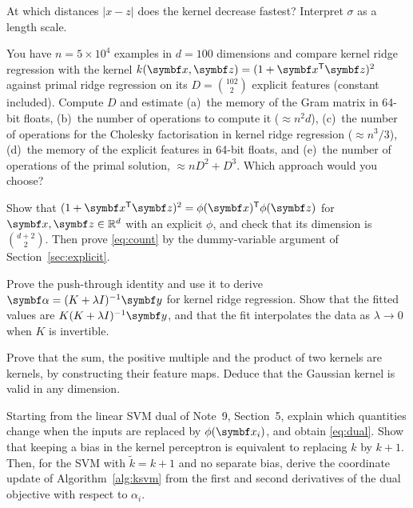 \documentclass[11pt]{article}
\newcommand{\z}{\vect{z}}
\newcommand{\y}{\vect{y}}
\newcommand{\valpha}{\vect{\alpha}}
\begin{document}
\begin{questions}
\begin{calculations}
  At which distances $|x - z|$ does the kernel decrease fastest? Interpret $\sigma$ as a length scale.
\item You have $n = 5 \times 10^4$ examples in $d = 100$ dimensions and compare kernel ridge regression with the kernel
  $k(\x, \z) = (1 + \x\T\z)^2$ against primal ridge regression on its $D = \binom{102}{2}$ explicit features (constant
  included). Compute $D$ and estimate (a)~the memory of the Gram matrix in 64-bit floats, (b)~the number of operations to
  compute it ($\approx n^2d$), (c)~the number of operations for the Cholesky factorisation in kernel ridge regression
  ($\approx n^3/3$), (d)~the memory of the explicit features in 64-bit floats, and (e)~the number of operations of the
  primal solution, $\approx nD^2 + D^3$. Which approach would you choose?
\end{calculations}

\begin{derivations}
\item Show that $(1 + \x\T\z)^2 = \phi(\x)\T\phi(\z)$ for $\x, \z \in \R^d$ with an explicit $\phi$, and check that its
  dimension is $\binom{d+2}{2}$. Then prove \eqref{eq:count} by the dummy-variable argument of Section~\ref{sec:explicit}.
\item Prove the push-through identity and use it to derive $\valpha = (K + \lambda I)^{-1}\y$ for kernel ridge regression.
  Show that the fitted values are $K(K + \lambda I)^{-1}\y$, and that the fit interpolates the data as $\lambda \to 0$ when
  $K$ is invertible.
\item Prove that the sum, the positive multiple and the product of two kernels are kernels, by constructing their feature
  maps. Deduce that the Gaussian kernel is valid in any dimension.
\item Starting from the linear SVM dual of Note~9, Section~5, explain which quantities change when the inputs are
  replaced by $\phi(\x_i)$, and obtain \eqref{eq:dual}. Show that keeping a bias in the kernel perceptron is equivalent to
  replacing $k$ by $k + 1$. Then, for the SVM with $\tilde k = k + 1$ and no separate bias, derive the coordinate update of
  Algorithm~\ref{alg:ksvm} from the first and second derivatives of the dual objective with respect to $\alpha_i$.
\end{derivations}


\end{questions}
\end{document}
